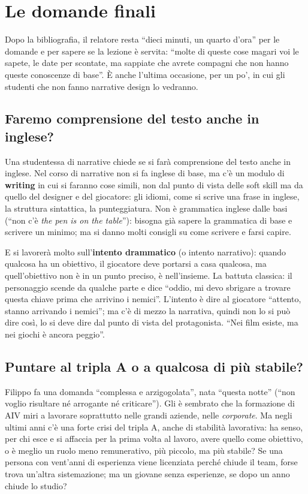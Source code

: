 \section{Le domande finali}
\label{pt:sec:domande}

Dopo la bibliografia, il relatore resta ``dieci minuti, un quarto d'ora'' per
le domande e per sapere se la lezione è servita: ``molte di queste cose magari
voi le sapete, le date per scontate, ma sappiate che avrete compagni che non
hanno queste conoscenze di base''. È anche l'ultima occasione, per un po', in
cui gli studenti che non fanno narrative design lo vedranno.

\subsection{Faremo comprensione del testo anche in inglese?}

Una studentessa di narrative chiede se si farà comprensione del testo anche in
inglese. Nel corso di narrative non si fa inglese di base, ma c'è un modulo di
\textbf{writing} in cui si faranno cose simili, non dal punto di vista delle
soft skill ma da quello del designer e del giocatore: gli idiomi, come si
scrive una frase in inglese, la struttura sintattica, la punteggiatura. Non è
grammatica inglese dalle basi (``non c'è \emph{the pen is on the table}''):
bisogna già sapere la grammatica di base e scrivere un minimo; ma si danno molti
consigli su come scrivere e farsi capire.

E si lavorerà molto sull'\textbf{intento drammatico} (o intento narrativo):
quando qualcosa ha un obiettivo, il giocatore deve portarsi a casa qualcosa, ma
quell'obiettivo non è in un punto preciso, è nell'insieme. La battuta classica:
il personaggio scende da qualche parte e dice ``oddio, mi devo sbrigare a
trovare questa chiave prima che arrivino i nemici''. L'intento è dire al
giocatore ``attento, stanno arrivando i nemici''; ma c'è di mezzo la narrativa,
quindi non lo si può dire così, lo si deve dire dal punto di vista del
protagonista. ``Nei film esiste, ma nei giochi è ancora peggio''.

\subsection{Puntare al tripla A o a qualcosa di più stabile?}

Filippo fa una domanda ``complessa e arzigogolata'', nata ``questa notte''
(``non voglio risultare né arrogante né criticare''). Gli è sembrato che la
formazione di AIV miri a lavorare soprattutto nelle grandi aziende, nelle
\emph{corporate}. Ma negli ultimi anni c'è una forte crisi del tripla A, anche
di stabilità lavorativa: ha senso, per chi esce e si affaccia per la prima volta
al lavoro, avere quello come obiettivo, o è meglio un ruolo meno remunerativo,
più piccolo, ma più stabile? Se una persona con vent'anni di esperienza viene
licenziata perché chiude il team, forse trova un'altra sistemazione; ma un
giovane senza esperienze, se dopo un anno chiude lo studio?

